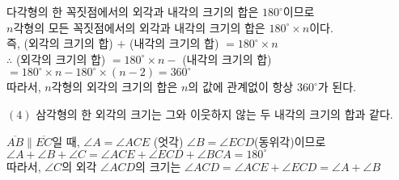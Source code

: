 
\begin{tcolorbox}[colback = white, colframe = blue!35!skyblue, title = \textmd{이해하기}]
    다각형의 한 꼭짓점에서의 외각과 내각의 크기의 합은 $180^{\circ}$이므로 \\ $n$각형의 모든 꼭짓점에서의
    외각과 내각의 크기의 합은  $180^{\circ} \times n$이다. \\
    즉, (외각의 크기의 합) $+$ (내각의 크기의 합) $= 180^{\circ} \times n$ \\ 
    $\therefore$ (외각의 크기의 합) $= 180^{\circ} \times n -$ (내각의 크기의 합) \\
    $= 180^{\circ} \times n - 180^{\circ} \times (n-2) = 360^{\circ}$ \\
    따라서, $n$각형의 외각의 크기의 합은 $n$의 값에 관계없이 항상 $360^{\circ}$가 된다.
\end{tcolorbox}

\begin{flushleft}
    $(4)$ 삼각형의 한 외각의 크기는 그와 이웃하지 않는 두 내각의 크기의 합과 같다.
\end{flushleft}

\begin{tcolorbox}[colback = white, colframe = blue!35!skyblue, title = \textmd{이해하기}]
    $\overline{AB} \parallel \overline{EC}$일 때, $\angle A = \angle ACE$ (엇각) $\angle B = \angle ECD$(동위각)이므로\\ 
    $\angle A + \angle B + \angle C = \angle ACE + \angle ECD + \angle BCA = 180^{\circ}$ \\
    따라서, $\angle C$의 외각 $\angle ACD$의 크기는 $\angle ACD = \angle ACE + \angle ECD = \angle A + \angle B$
    
\end{tcolorbox}